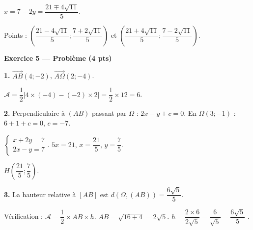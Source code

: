 $x = 7 - 2y = \dfrac{21 \mp 4\sqrt{11}}{5}$.

Points : $\left(\dfrac{21 - 4\sqrt{11}}{5} ; \dfrac{7 + 2\sqrt{11}}{5}\right)$ et $\left(\dfrac{21 + 4\sqrt{11}}{5} ; \dfrac{7 - 2\sqrt{11}}{5}\right)$.

\bigskip

\textbf{Exercice 5 — Problème (4 pts)}


\textbf{1.} $\vec{AB}(4 ; -2)$, $\vec{A\Omega}(2 ; -4)$.

$\mathcal{A} = \dfrac{1}{2}|4 \times (-4) - (-2) \times 2| = \dfrac{1}{2} \times 12 = 6$.

\textbf{2.} Perpendiculaire à $(AB)$ passant par $\Omega$ : $2x - y + c = 0$. En $\Omega(3;-1)$ : $6 + 1 + c = 0$, $c = -7$.

$\begin{cases} x + 2y = 7 \\ 2x - y = 7 \end{cases}$. $5x = 21$, $x = \dfrac{21}{5}$, $y = \dfrac{7}{5}$.

$H\!\left(\dfrac{21}{5} ; \dfrac{7}{5}\right)$.

\textbf{3.} La hauteur relative à $[AB]$ est $d(\Omega, (AB)) = \dfrac{6\sqrt{5}}{5}$.

Vérification : $\mathcal{A} = \dfrac{1}{2} \times AB \times h$. $AB = \sqrt{16+4} = 2\sqrt{5}$. $h = \dfrac{2 \times 6}{2\sqrt{5}} = \dfrac{6}{\sqrt{5}} = \dfrac{6\sqrt{5}}{5}$ \checkmark.
